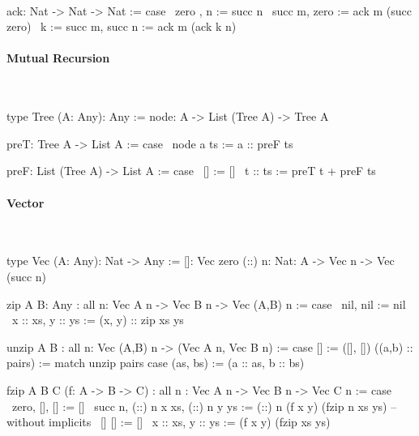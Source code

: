 \ \begin{alba}
    ack: Nat -> Nat -> Nat := case
        \ zero  ,      n      :=  succ n
        \ succ m,      zero   :=  ack m (succ zero)
        \ k := succ m, succ n :=  ack m (ack k n)
\end{alba}









\paragraph{Mutual Recursion}

\ \begin{alba}
    type Tree (A: Any): Any :=
        node: A -> List (Tree A) -> Tree A

    preT: Tree A -> List A := case
        \ node a ts := a :: preF ts

    preF: List (Tree A) -> List A := case
        \ []         :=  []
        \ t :: ts    :=  preT t + preF ts
\end{alba}






\paragraph{Vector}

\ \begin{alba}
    type Vec (A: Any): Nat -> Any :=
        []:  Vec zero
        (::) {n: Nat}: A -> Vec n -> Vec (succ n)

    zip {A B: Any}
    : all {n}: Vec A n -> Vec B n -> Vec (A,B) n
    := case
        \ nil,     nil     := nil
        \ x :: xs, y :: ys := (x, y) :: zip xs ys


    unzip {A B}
    : all {n}: Vec (A,B) n -> (Vec A n, Vec B n)
    := case
        [] :=
            ([], [])
        ((a,b) :: pairs) :=
            match unzip pairs case
                (as, bs) :=
                    (a :: as, b :: bs)
\end{alba}

\begin{alba}
    fzip {A B C} (f: A -> B -> C)
        : all {n}
          : Vec A n -> Vec B n -> Vec C n
    := case
        \ {zero},   [],            [] :=
            []
        \ {succ n}, (::) {n} x xs, (::) {n} y ys :=
            (::) {n} (f x y) (fzip {n} xs ys)
        -- without implicits
        \ [] []            := []
        \ x :: xs, y :: ys := (f x y) (fzip xs ys)
\end{alba}


